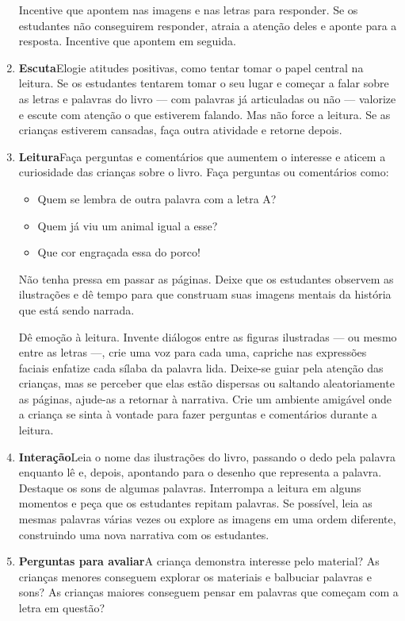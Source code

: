 \documentclass[11pt]{extarticle}
\begin{document}
\begin{enumerate}
Incentive que apontem nas imagens e nas letras para responder. Se os estudantes não 
conseguirem responder, atraia a atenção deles e aponte 
para a resposta. Incentive que apontem em seguida. 


\item \textbf{Escuta}\quad Elogie atitudes positivas, como 
tentar tomar o papel central na leitura. Se os estudantes tentarem 
tomar o seu lugar e começar a falar sobre as letras e palavras do livro --- com palavras já articuladas 
ou não --- valorize e escute com atenção o que estiverem falando. Mas não 
force a leitura. Se as crianças estiverem cansadas, faça outra atividade 
e retorne depois. 

\item \textbf{Leitura}\quad Faça perguntas e comentários que aumentem o 
interesse e aticem a curiosidade das crianças sobre o livro. Faça 
perguntas ou comentários como: 

\begin{itemize}
\item Quem se lembra de outra palavra com a letra A?
\item Quem já viu um animal igual a esse?
\item Que cor engraçada essa do porco!
\end{itemize}



Não tenha pressa em passar as páginas. Deixe que os estudantes 
observem as ilustrações e dê tempo para que construam suas imagens 
mentais da história que está sendo narrada. 

Dê emoção 
à leitura. Invente diálogos entre as figuras ilustradas --- ou mesmo entre as letras ---, crie uma voz para 
cada uma, capriche nas expressões faciais enfatize cada sílaba da palavra lida.
Deixe-se guiar pela atenção das crianças, mas se perceber que 
elas estão dispersas ou saltando aleatoriamente as páginas, ajude-as 
a retornar à narrativa. Crie um ambiente amigável onde a criança 
se sinta à vontade para fazer perguntas e comentários durante a leitura.

\item \textbf{Interação}\quad Leia o nome das ilustrações do livro, passando o dedo pela palavra enquanto lê e, depois, apontando para o desenho que representa a palavra.
Destaque os sons de algumas 
palavras. Interrompa a leitura em alguns momentos e peça que 
os estudantes repitam palavras. Se possível, 
leia as mesmas palavras várias vezes ou explore as imagens em uma ordem 
diferente, construindo uma nova narrativa com os estudantes. 

\item \textbf{Perguntas para avaliar}\quad A criança demonstra interesse pelo material? As crianças menores conseguem explorar os materiais e balbuciar palavras e sons? As crianças maiores conseguem pensar em palavras que começam com a letra em questão?
\end{enumerate}
\end{document}
